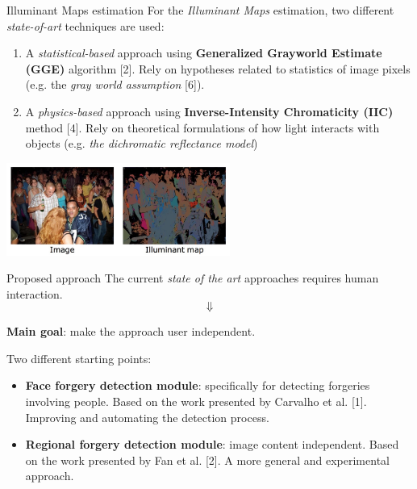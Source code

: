 \begin{tframe}{Illuminant Maps estimation}
\vspace{0.2cm}
For the \emph{Illuminant Maps} estimation, two different \emph{state-of-art} techniques are used: 
\vspace{0.3cm}
\begin{enumerate}
\item A \emph{statistical-based} approach using \textbf{Generalized Grayworld Estimate (GGE)} algorithm [2]. Rely on hypotheses related to statistics of image pixels (e.g.  the \emph{gray world assumption} [6]).
\vspace{0.2cm}
\item A \emph{physics-based} approach using \textbf{Inverse-Intensity Chromaticity (IIC)} method [4]. Rely on theoretical formulations of how light interacts with objects (e.g. \emph{the dichromatic reflectance model})
\end{enumerate}

\begin{center}
\includegraphics[width=0.55\textwidth]{images/riess.jpg}
\end{center}

\end{tframe}



\begin{tframe}{Proposed approach}
The current \emph{state of the art} approaches requires human interaction. 
$$\Downarrow$$
\begin{center}
\textbf{Main goal}: make the approach user independent.
\end{center}
Two different starting points:
\vspace{0.1cm}
\begin{itemize}
\item \textbf{Face forgery detection module}: specifically for detecting forgeries involving people. Based on the work presented by Carvalho et al. [1]. Improving and automating the detection process.

\item \textbf{Regional forgery detection module}: image content independent. Based on the work presented by Fan et al. [2]. A more general and experimental approach.
\end{itemize}

\end{tframe}

